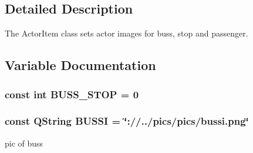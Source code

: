 \subsection{Detailed Description}
The Actor\-Item class sets actor images for buss, stop and passenger. 

\subsection{Variable Documentation}
\hypertarget{actoritem_8hh_a65e7f70d9c573d5bfd13804a406fc067}{
\subsubsection[{B\-U\-S\-S\-\_\-\-S\-T\-O\-P}]{\setlength{\rightskip}{0pt plus 5cm}const int B\-U\-S\-S\-\_\-\-S\-T\-O\-P = 0}}\label{actoritem_8hh_a65e7f70d9c573d5bfd13804a406fc067}
\hypertarget{actoritem_8hh_aedf8524adc61b4d09d86db4fa2f207d2}{
\subsubsection[{B\-U\-S\-S\-I}]{\setlength{\rightskip}{0pt plus 5cm}const Q\-String B\-U\-S\-S\-I = \char`\"{}\-://../pics/pics/bussi.\-png\char`\"{}}}\label{actoritem_8hh_aedf8524adc61b4d09d86db4fa2f207d2}


pic of buss 

